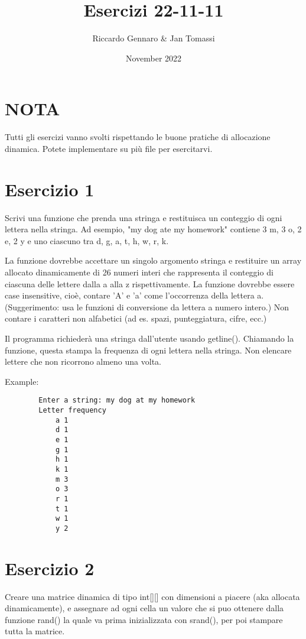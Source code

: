 \documentclass{article}
\title{Esercizi 22-11-11}
\author{Riccardo Gennaro & Jan Tomassi}
\date{November 2022}
\begin{document}
\maketitle

\section*{NOTA}

Tutti gli esercizi vanno svolti rispettando le buone pratiche di allocazione dinamica. Potete implementare su più file per esercitarvi.

\section*{Esercizio 1}

    Scrivi una funzione che prenda una stringa e restituisca un conteggio di ogni lettera nella stringa. Ad esempio, "my dog
    ate my homework" contiene 3 m, 3 o, 2 e, 2 y e uno ciascuno tra d, g, a, t, h, w, r, k.

    La funzione dovrebbe accettare un singolo argomento stringa e restituire un array allocato dinamicamente di 26 numeri interi
    che rappresenta il conteggio di ciascuna delle lettere dalla a alla z rispettivamente. La funzione dovrebbe essere case insensitive, cioè,
    contare 'A' e 'a' come l'occorrenza della lettera a. (Suggerimento: usa le funzioni di conversione da lettera a numero intero.) Non contare i caratteri non alfabetici (ad es. spazi, punteggiatura, cifre, ecc.)

    Il programma richiederà una stringa dall'utente usando getline(). Chiamando la funzione, questa stampa la frequenza di ogni lettera nella stringa. Non elencare lettere che non ricorrono almeno una volta.

    Example:
    \begin{verbatim}
        Enter a string: my dog at my homework
        Letter frequency
            a 1
            d 1
            e 1
            g 1
            h 1
            k 1
            m 3
            o 3
            r 1
            t 1
            w 1
            y 2
    \end{verbatim}

    \section*{Esercizio 2}
    Creare una matrice dinamica di tipo int[][] con dimensioni a piacere (aka allocata dinamicamente), e assegnare ad ogni cella un valore che si puo ottenere dalla funzione rand() la quale va prima inizializzata con srand(), per poi stampare tutta la matrice.
\end{document}
